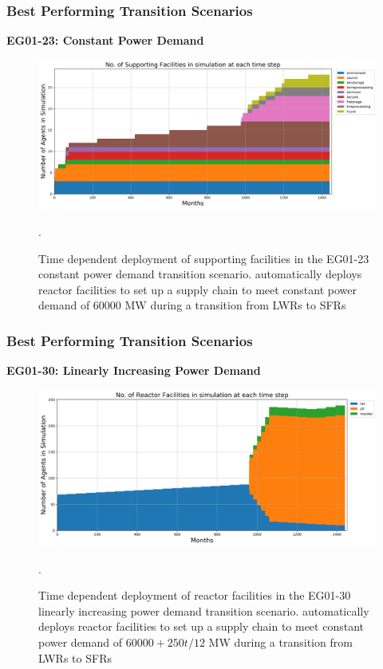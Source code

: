 \begin{frame}
    \frametitle{Best Performing Transition Scenarios}
    \textbf{EG01-23: Constant Power Demand}
    \begin{figure}[htbp!]
        \begin{center}
          \includegraphics[width=\textwidth]{images/eg23-stack_support.png}
        \end{center}
              \caption{Time dependent deployment of supporting facilities in 
              the EG01-23 constant power demand transition scenario. 
              \deploy automatically deploys reactor facilities 
              to set up a supply chain to meet constant power demand of $60000$ MW
              during a transition from \glspl{LWR} to \glspl{SFR}}.
      \end{figure}
\end{frame}

\begin{frame}
    \frametitle{Best Performing Transition Scenarios}
    \textbf{EG01-30: Linearly Increasing Power Demand}
    \begin{figure}[htbp!]
        \begin{center}
          \includegraphics[width=\textwidth]{images/eg30-stack_reactor.png}
        \end{center}
              \caption{Time dependent deployment of reactor facilities in 
              the EG01-30 linearly increasing power demand transition scenario. 
              \deploy automatically deploys reactor facilities 
              to set up a supply chain to meet constant power demand of $60000+250t/12$ MW
              during a transition from \glspl{LWR} to \glspl{SFR}}.
      \end{figure}
\end{frame}

